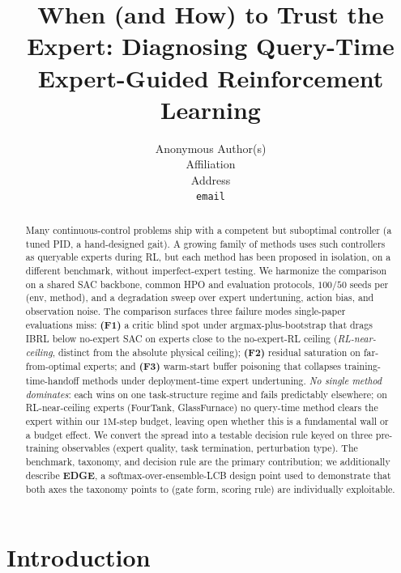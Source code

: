 \documentclass{article}
\title{When (and How) to Trust the Expert: Diagnosing Query-Time Expert-Guided Reinforcement Learning}
\author{%
  Anonymous Author(s) \\
  Affiliation \\
  Address \\
  \texttt{email} \\
}
\begin{document}
\maketitle

\begin{abstract}

Many continuous-control problems ship with a competent but
suboptimal controller (a tuned PID, a hand-designed gait). A
growing family of methods uses such controllers as queryable
experts during RL, but each method has been proposed in isolation,
on a different benchmark, without imperfect-expert testing. We
harmonize the comparison on a shared SAC backbone, common HPO and
evaluation protocols, $100/50$ seeds per (env, method), and a
degradation sweep over expert undertuning, action bias, and
observation noise. The comparison surfaces three failure modes
single-paper evaluations miss: \textbf{(F1)} a critic blind spot
under argmax-plus-bootstrap that drags IBRL below no-expert SAC on
experts close to the no-expert-RL ceiling (\emph{RL-near-ceiling},
distinct from the absolute physical ceiling); \textbf{(F2)}
residual saturation on far-from-optimal experts; and \textbf{(F3)}
warm-start buffer poisoning that collapses training-time-handoff
methods under deployment-time expert undertuning. \emph{No single
method dominates}: each wins on one task-structure regime and
fails predictably elsewhere; on RL-near-ceiling experts (FourTank,
GlassFurnace) no query-time method clears the expert within our
$1\mathrm{M}$-step budget, leaving open whether this is a
fundamental wall or a budget effect. We convert the spread into a
testable decision rule keyed on three pre-training observables
(expert quality, task termination, perturbation type). The
benchmark, taxonomy, and decision rule are the primary
contribution; we additionally describe \textbf{EDGE}, a
softmax-over-ensemble-LCB design point used to demonstrate that
both axes the taxonomy points to (gate form, scoring rule) are
individually exploitable.


\end{abstract}

\section{Introduction}
\label{sec:intro}
\end{document}
